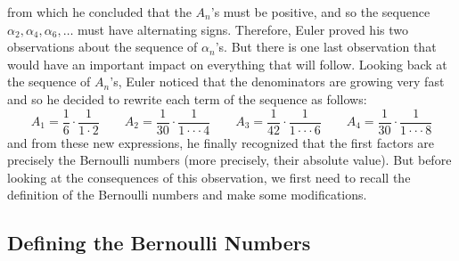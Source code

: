 from which he concluded that the $A_n$'s must be positive, and so the sequence $\alpha_2, \alpha_4, \alpha_6, \dots$ must have alternating signs. Therefore, Euler proved his two observations about the sequence of $\alpha_n$'s. But there is one last observation that would have an important impact on everything that will follow. Looking back at the sequence of $A_n$'s, Euler noticed that the denominators are growing very fast and so he decided to rewrite each term of the sequence as follows:
$$A_1 = \frac{1}{6}\cdot \frac{1}{1\cdot 2} \qquad A_2 = \frac{1}{30}\cdot\frac{1}{1\cdot\cdot\cdot 4} \qquad A_3 = \frac{1}{42}\cdot\frac{1}{1\cdot\cdot\cdot 6} \qquad A_4 = \frac{1}{30}\cdot\frac{1}{1\cdot\cdot\cdot 8}$$
and from these new expressions, he finally recognized that the first factors are precisely the Bernoulli numbers (more precisely, their absolute value). But before looking at the consequences of this observation, we first need to recall the definition of the Bernoulli numbers and make some modifications.

\subsection*{Defining the Bernoulli Numbers}

